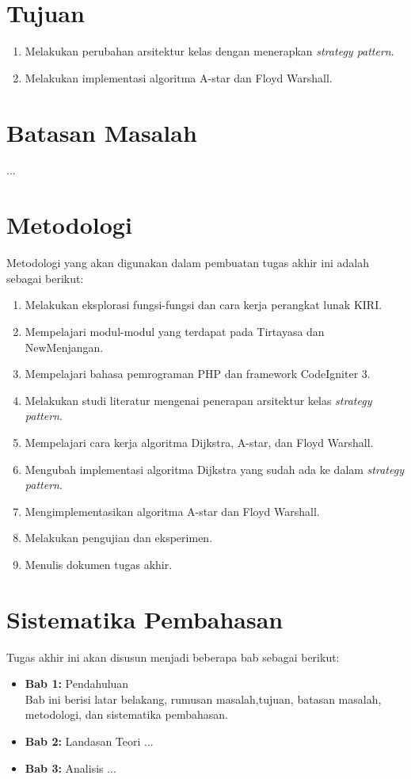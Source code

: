 \section{Tujuan}
\label{sec:tujuan}
	\begin{enumerate}
                \item Melakukan perubahan arsitektur kelas dengan menerapkan \textit{strategy pattern}.
                \item Melakukan implementasi algoritma A-star dan Floyd Warshall.
            \end{enumerate}

\section{Batasan Masalah}
\label{sec:batasan}
...

\section{Metodologi}
\label{sec:metlit}
Metodologi yang akan digunakan dalam pembuatan tugas akhir ini adalah sebagai berikut:
	\begin{enumerate}
		\item Melakukan eksplorasi fungsi-fungsi dan cara kerja perangkat lunak KIRI.
		\item Mempelajari modul-modul yang terdapat pada Tirtayasa dan NewMenjangan.
		\item Mempelajari bahasa pemrograman PHP dan framework CodeIgniter 3.
		\item Melakukan studi literatur mengenai penerapan arsitektur kelas \textit{strategy pattern}.
    		\item Mempelajari cara kerja algoritma Dijkstra, A-star, dan Floyd Warshall.
    		\item Mengubah implementasi algoritma Dijkstra yang sudah ada ke dalam \textit{strategy pattern}.
    		\item Mengimplementasikan algoritma A-star dan Floyd Warshall.
    		\item Melakukan pengujian dan eksperimen.
    		\item Menulis dokumen tugas akhir.
	\end{enumerate}

\section{Sistematika Pembahasan}
\label{sec:sispem}
Tugas akhir ini akan disusun menjadi beberapa bab sebagai berikut:
	\begin{itemize}
		\item \textbf{Bab 1:} Pendahuluan
		\\ Bab ini berisi latar belakang, rumusan masalah,tujuan, batasan masalah, metodologi, dan sistematika pembahasan.
		\item \textbf{Bab 2:} Landasan Teori
		...
		\item \textbf{Bab 3:} Analisis
		...
	\end{itemize}